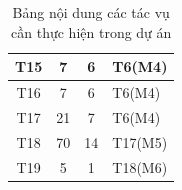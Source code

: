\documentclass[a4paper, 12pt]{article}
\begin{document}
\begin{table}[H]
\begin{center}
\begin{tabular}{|c|c|c|l|}
            T15     & 7                    & 6               &T6(M4) \\ \hline \rowcolor[HTML]{C9DAF8} 
            T16     & 7                    & 6               &T6(M4) \\ \hline \rowcolor[HTML]{C9DAF8} 
            T17     & 21                   & 7               &T6(M4) \\ \hline \rowcolor[HTML]{FCE5CD} 
            T18     & 70                   & 14              &T17(M5) \\ \hline \rowcolor[HTML]{D0E0E3} 
            T19     & 5                    & 1               &T18(M6) \\ \hline
            \end{tabular}
            \caption{Bảng nội dung các tác vụ cần thực hiện trong dự án}
        \end{center}
    \end{table}
\end{document}
